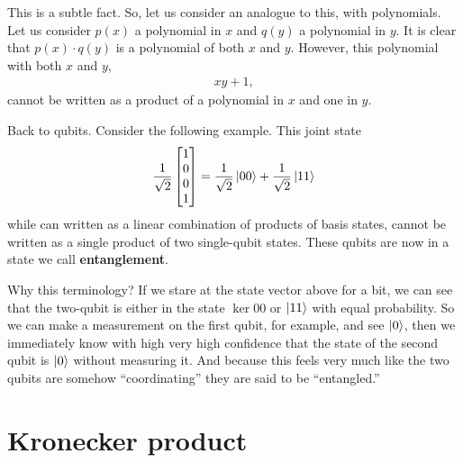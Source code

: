 \documentclass[a4paper,11pt]{article}
\numberwithin{equation}{section}
\theoremstyle{definition}
\newcommand{\f}[2]{\frac{#1}{#2}}
\begin{document}
This is a subtle fact. So, let us consider an analogue to this, with polynomials. Let us consider $p(x)$ a polynomial in $x$ and $q(y)$ a polynomial in $y$. It is clear that $p(x)\cdot q(y)$ is a polynomial of both $x$ and $y$. However, this polynomial with both $x$ and $y$,
\begin{align*}
xy + 1,
\end{align*}
cannot be written as a product of a polynomial in $x$ and one in $y$. 

Back to qubits. Consider the following example. This joint state
\begin{align*}
\frac{1}{\sqrt{2}}\begin{bmatrix}
1\\0\\0\\1
\end{bmatrix} = \f{1}{\sqrt{2}}\ket{00} + \f{1}{\sqrt{2}}\ket{11}
\end{align*}
while can written as a linear combination of products of basis states, cannot be written as a single product of two single-qubit states. These qubits are now in a state we call \textbf{entanglement}. 

Why this terminology? If we stare at the state vector above for a bit, we can see that the two-qubit is either in the state $\ker{00}$ or $\left\vert{11}\right\rangle$ with equal probability. So we can make a measurement on the first qubit, for example, and see $\left\vert{0}\right\rangle$, then we immediately know with high very high confidence that the state of the second qubit is $\left\vert{0}\right\rangle$ without measuring it. And because this feels very much like the two qubits are somehow ``coordinating'' they are said to be ``entangled.''

\section{Kronecker product}
\end{document}
